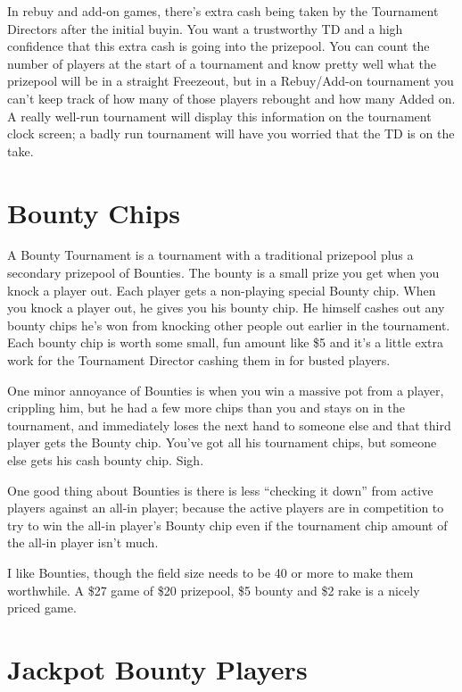 In rebuy and add-on games, there's extra cash being taken by
the Tournament Directors after the initial buyin. You want
a trustworthy TD and a high confidence that this extra cash is
going into the prizepool. You can count the number of players
at the start of a tournament and know pretty well what the prizepool
will be in a straight Freezeout, but in a Rebuy/Add-on tournament
you can't keep track of how many of those players rebought and how
many Added on. A really well-run tournament will display this
information on the tournament clock screen; a badly run tournament
will have you worried that the TD is on the take.

\section{Bounty Chips}

A Bounty Tournament is a tournament with a traditional prizepool
plus a secondary prizepool of Bounties. The bounty
is a small prize you get when you knock a player out.
Each player gets a non-playing special Bounty chip.
When you knock a player out, he gives you his bounty chip.
He himself cashes out any bounty chips he's won from knocking
other people out earlier in the tournament. Each bounty chip is worth
some small, fun amount like \$5 and it's a little extra work for the
Tournament Director cashing them in for busted players.

One minor annoyance of Bounties is when you win a massive pot
from a player, crippling him, but he had a few more chips than
you and stays on in the tournament, and immediately loses the
next hand to someone else and that third player gets the
Bounty chip. You've got all his tournament chips, but someone
else gets his cash bounty chip. Sigh.

One good thing about Bounties is there is less ``checking it down''
from active players against an all-in player; because the active
players are in competition to try to win the all-in player's
Bounty chip even if the tournament chip amount of the all-in player
isn't much.

I like Bounties, though the field size needs to be 40 or more to
make them worthwhile. A \$27 game of \$20 prizepool, \$5 bounty
and \$2 rake is a nicely priced game.

\section{Jackpot Bounty Players}

